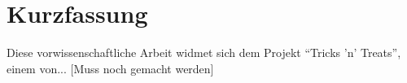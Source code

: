 
\chapter{Kurzfassung}

Diese vorwissenschaftliche Arbeit widmet sich dem Projekt "`Tricks 'n' Treats"', einem von... [Muss noch gemacht werden]